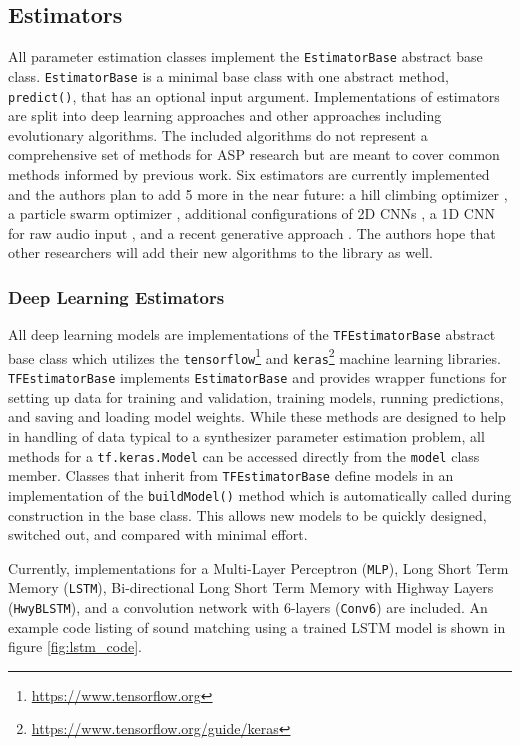 \subsection{Estimators}
All parameter estimation classes implement the \texttt{EstimatorBase} abstract base class. \texttt{EstimatorBase} is a minimal base class with one abstract method, \texttt{predict()}, that has an optional input argument. Implementations of estimators are split into deep learning approaches and other approaches including evolutionary algorithms.  The included algorithms do not represent a comprehensive set of methods for ASP research but are meant to cover common methods informed by previous work. Six estimators are currently implemented and the authors plan to add 5 more in the near future: a hill climbing optimizer \cite{yee2018automatic}, a particle swarm optimizer \cite{heise2009automatic}, additional configurations of 2D CNNs \cite{barkan2019inversynth}, a 1D CNN for raw audio input \cite{barkan2019inversynth}, and a recent generative approach \cite{esling2020flow}. The authors hope that other researchers will add their new algorithms to the library as well.

\subsubsection{Deep Learning Estimators}
All deep learning models are implementations of the \texttt{TFEstimatorBase} abstract base class which utilizes the \texttt{tensorflow}\footnote{\url{https://www.tensorflow.org}} and \texttt{keras}\footnote{\url{https://www.tensorflow.org/guide/keras}} machine learning libraries. \texttt{TFEstimatorBase} implements \texttt{EstimatorBase} and provides wrapper functions for setting up data for training and validation, training models, running predictions, and saving and loading model weights. While these methods are designed to help in handling of data typical to a synthesizer parameter estimation problem, all methods for a \texttt{tf.keras.Model} can be accessed directly from the \texttt{model} class member. Classes that inherit from \texttt{TFEstimatorBase} define models in an implementation of the \texttt{buildModel()} method which is automatically called during construction in the base class. This allows new models to be quickly designed, switched out, and compared with minimal effort.

Currently, implementations for a Multi-Layer Perceptron (\texttt{MLP}), Long Short Term Memory (\texttt{LSTM}), Bi-directional Long Short Term Memory with Highway Layers (\texttt{HwyBLSTM}), and a convolution network with 6-layers (\texttt{Conv6}) are included. An example code listing of sound matching using a trained LSTM model is shown in figure \ref{fig:lstm_code}.

